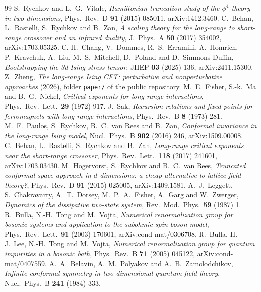 \begin{thebibliography}{99}
 S.~Rychkov and L.~G.~Vitale, \emph{Hamiltonian truncation study of the $\phi^4$ theory in two dimensions}, Phys.\ Rev.\ D \textbf{91} (2015) 085011, arXiv:1412.3460.
 C.~Behan, L.~Rastelli, S.~Rychkov and B.~Zan, \emph{A scaling theory for the long-range to short-range crossover and an infrared duality}, J.\ Phys.\ A \textbf{50} (2017) 354002, arXiv:1703.05325.
 C.-H.~Chang, V.~Dommes, R.~S.~Erramilli, A.~Homrich, P.~Kravchuk, A.~Liu, M.~S.~Mitchell, D.~Poland and D.~Simmons-Duffin, \emph{Bootstrapping the 3d Ising stress tensor}, JHEP \textbf{03} (2025) 136, arXiv:2411.15300.
 Z.~Zheng, \emph{The long-range Ising CFT: perturbative and nonperturbative approaches} (2026), folder \texttt{paper/} of the public repository.
 M.~E.~Fisher, S.-k.~Ma and B.~G.~Nickel, \emph{Critical exponents for long-range interactions}, Phys.\ Rev.\ Lett.\ \textbf{29} (1972) 917.
 J.~Sak, \emph{Recursion relations and fixed points for ferromagnets with long-range interactions}, Phys.\ Rev.\ B \textbf{8} (1973) 281.
 M.~F.~Paulos, S.~Rychkov, B.~C.~van Rees and B.~Zan, \emph{Conformal invariance in the long-range Ising model}, Nucl.\ Phys.\ B \textbf{902} (2016) 246, arXiv:1509.00008.
 C.~Behan, L.~Rastelli, S.~Rychkov and B.~Zan, \emph{Long-range critical exponents near the short-range crossover}, Phys.\ Rev.\ Lett.\ \textbf{118} (2017) 241601, arXiv:1703.03430.
 M.~Hogervorst, S.~Rychkov and B.~C.~van Rees, \emph{Truncated conformal space approach in $d$ dimensions: a cheap alternative to lattice field theory?}, Phys.\ Rev.\ D \textbf{91} (2015) 025005, arXiv:1409.1581.
 A.~J.~Leggett, S.~Chakravarty, A.~T.~Dorsey, M.~P.~A.~Fisher, A.~Garg and W.~Zwerger, \emph{Dynamics of the dissipative two-state system}, Rev.\ Mod.\ Phys.\ \textbf{59} (1987) 1.
 R.~Bulla, N.-H.~Tong and M.~Vojta, \emph{Numerical renormalization group for bosonic systems and application to the subohmic spin-boson model}, Phys.\ Rev.\ Lett.\ \textbf{91} (2003) 170601, arXiv:cond-mat/0306708.
 R.~Bulla, H.-J.~Lee, N.-H.~Tong and M.~Vojta, \emph{Numerical renormalization group for quantum impurities in a bosonic bath}, Phys.\ Rev.\ B \textbf{71} (2005) 045122, arXiv:cond-mat/0407559.
 A.~A.~Belavin, A.~M.~Polyakov and A.~B.~Zamolodchikov, \emph{Infinite conformal symmetry in two-dimensional quantum field theory}, Nucl.\ Phys.\ B \textbf{241} (1984) 333.

\end{thebibliography}
